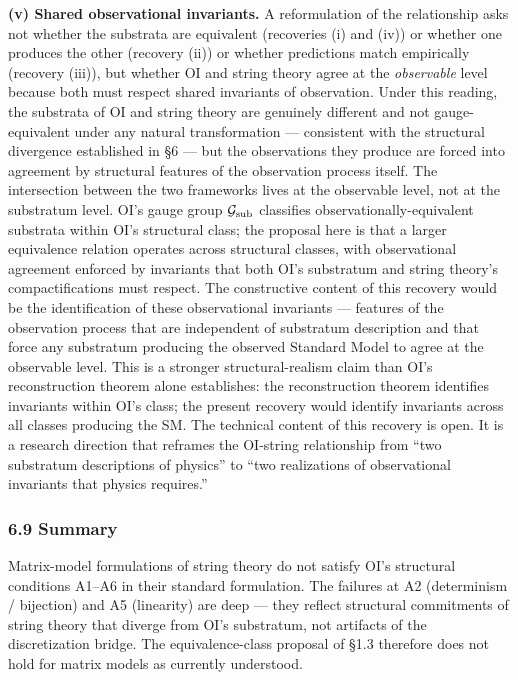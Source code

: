 \documentclass[
]{article}
\begin{document}
\textbf{(v) Shared observational invariants.} A reformulation of the
relationship asks not whether the substrata are equivalent (recoveries
(i) and (iv)) or whether one produces the other (recovery (ii)) or
whether predictions match empirically (recovery (iii)), but whether OI
and string theory agree at the \emph{observable} level because both must
respect shared invariants of observation. Under this reading, the
substrata of OI and string theory are genuinely different and not
gauge-equivalent under any natural transformation --- consistent with
the structural divergence established in §6 --- but the observations
they produce are forced into agreement by structural features of the
observation process itself. The intersection between the two frameworks
lives at the observable level, not at the substratum level. OI's gauge
group \(\mathcal{G}_{\rm sub}\) classifies observationally-equivalent
substrata within OI's structural class; the proposal here is that a
larger equivalence relation operates across structural classes, with
observational agreement enforced by invariants that both OI's substratum
and string theory's compactifications must respect. The constructive
content of this recovery would be the identification of these
observational invariants --- features of the observation process that
are independent of substratum description and that force any substratum
producing the observed Standard Model to agree at the observable level.
This is a stronger structural-realism claim than OI's reconstruction
theorem alone establishes: the reconstruction theorem identifies
invariants within OI's class; the present recovery would identify
invariants across all classes producing the SM. The technical content of
this recovery is open. It is a research direction that reframes the
OI-string relationship from ``two substratum descriptions of physics''
to ``two realizations of observational invariants that physics
requires.''

\hypertarget{summary}{%
\subsubsection{6.9 Summary}\label{summary}}

Matrix-model formulations of string theory do not satisfy OI's
structural conditions A1--A6 in their standard formulation. The failures
at A2 (determinism / bijection) and A5 (linearity) are deep --- they
reflect structural commitments of string theory that diverge from OI's
substratum, not artifacts of the discretization bridge. The
equivalence-class proposal of §1.3 therefore does not hold for matrix
models as currently understood.
\end{document}
